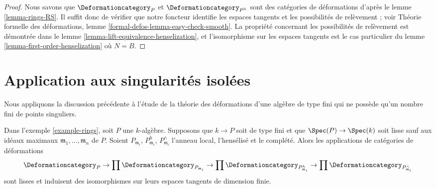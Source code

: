 \begin{proof}
Nous savons que $\Deformationcategory_P$ et $\Deformationcategory_{P^h}$
sont des catégories de déformations d'après le lemme \ref{lemma-rings-RS}.
Il suffit donc de vérifier que
notre foncteur identifie les espaces tangents et les possibilités
de relèvement ; voir Théorie formelle des déformations, lemme
\ref{formal-defos-lemma-easy-check-smooth}.
La propriété concernant les possibilités de relèvement est démontrée dans le
lemme \ref{lemma-lift-equivalence-henselization},
et l'isomorphisme sur les espaces tangents est le cas particulier du
lemme \ref{lemma-first-order-henselization} où $N = B$.
\end{proof}



\section{Application aux singularités isolées}
\label{section-isolated}

\noindent
Nous appliquons la discussion précédente à l'étude de la théorie des déformations
d'une algèbre de type fini qui ne possède qu'un nombre fini de points singuliers.

\begin{lemma}
\label{lemma-isolated}
Dans l'exemple \ref{example-rings}, soit $P$ une $k$-algèbre.
Supposons que $k \to P$ soit de type fini et que $\Spec(P) \to \Spec(k)$
soit lisse sauf aux idéaux maximaux
$\mathfrak m_1, \ldots, \mathfrak m_n$ de $P$.
Soient $P_{\mathfrak m_i}$, $P_{\mathfrak m_i}^h$, $P_{\mathfrak m_i}^\wedge$
l'anneau local, l'hensélisé et le complété.
Alors les applications de catégories de déformations
$$
\Deformationcategory_P \to
\prod \Deformationcategory_{P_{\mathfrak m_i}} \to
\prod \Deformationcategory_{P_{\mathfrak m_i}^h} \to
\prod \Deformationcategory_{P_{\mathfrak m_i}^\wedge}
$$
sont lisses et induisent des isomorphismes sur leurs espaces tangents
de dimension finie.
\end{lemma}

